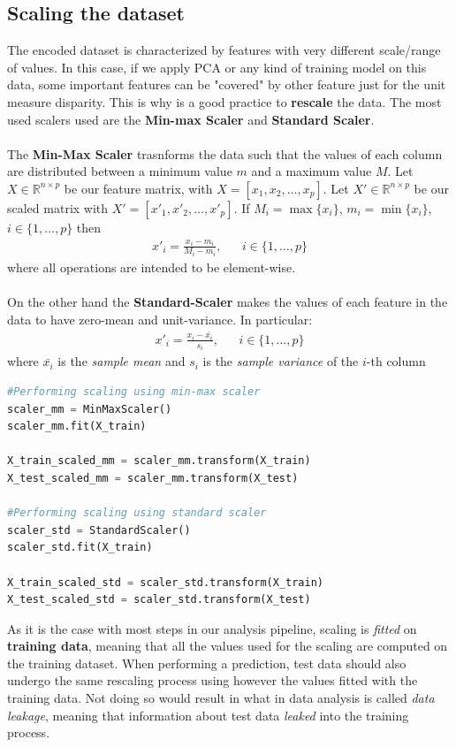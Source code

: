 \subsection{Scaling the dataset}

The encoded dataset is characterized by features with very different scale/range  of values. In this case, if we apply PCA or any kind of training model on this data, some important features can be "covered" by other feature just for the unit measure disparity. This is why is a good practice to \textbf{rescale} the data. The most used scalers used are the \textbf{Min-max Scaler} and \textbf{Standard Scaler}.\\
\\
The \textbf{Min-Max Scaler} trasnforms the data such that the values of each column are distributed between a minimum value $m$ and a maximum value $M$. Let $X \in \mathbb{R}^{n \times p}$ be our feature matrix, with $X=[x_1, x_2, \dots, x_p]$. Let $X' \in \mathbb{R}^{n \times p}$ be our scaled matrix with $X'=[x'_1, x'_2, \dots, x'_p]$. If $M_i = \max\{x_i\}$, $m_i = \min\{x_i\}$, $i \in \{1,  \dots,  p\}$ then
\begin{align}
    x'_i = \frac{x_i - m_i}{M_i-m_i}, && i \in \{1,  \dots,  p\}    
\end{align}
where all operations are intended to be element-wise. \\
\\
On the other hand the \textbf{Standard-Scaler} makes the values of each feature in the data to have zero-mean and unit-variance. In particular: 
\begin{align}
    x'_i = \frac{x_i - \bar{x_i}}{s_i}, && i \in \{1,  \dots,  p\}    
\end{align}
where $\bar{x_i}$ is the \textit{sample mean} and $s_i$ is the \textit{sample variance} of the $i$-th column
\begin{lstlisting}[language=Python, caption= Data scaling]
#Performing scaling using min-max scaler
scaler_mm = MinMaxScaler()
scaler_mm.fit(X_train)

X_train_scaled_mm = scaler_mm.transform(X_train)
X_test_scaled_mm = scaler_mm.transform(X_test)

#Performing scaling using standard scaler
scaler_std = StandardScaler()
scaler_std.fit(X_train)

X_train_scaled_std = scaler_std.transform(X_train)
X_test_scaled_std = scaler_std.transform(X_test)
\end{lstlisting}
As it is the case with most steps in our analysis pipeline, scaling is \textit{fitted} on \textbf{training data}, meaning that all the values used for the scaling are computed on the training dataset. When performing a prediction, test data should also undergo the same rescaling process using however the values fitted with the training data. Not doing so would result in what in data analysis is called \textit{data leakage}, meaning that information about test data \textit{leaked} into the training process.

